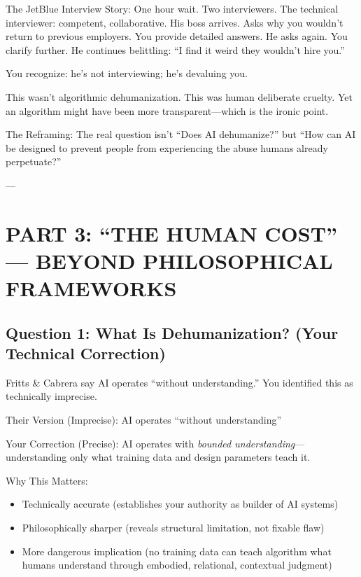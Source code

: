 \documentclass[12pt,letterpaper]{article}
\begin{document}
\begin{livedexperience}
The JetBlue Interview Story: One hour wait. Two interviewers. The technical interviewer: competent, collaborative. His boss arrives. Asks why you wouldn't return to previous employers. You provide detailed answers. He asks again. You clarify further. He continues belittling: ``I find it weird they wouldn't hire you.''

You recognize: he's not interviewing; he's devaluing you.

This wasn't algorithmic dehumanization. This was human deliberate cruelty. Yet an algorithm might have been more transparent---which is the ironic point.

The Reframing: The real question isn't ``Does AI dehumanize?'' but ``How can AI be designed to prevent people from experiencing the abuse humans already perpetuate?''
\end{livedexperience}

---

\section{PART 3: ``THE HUMAN COST'' --- BEYOND PHILOSOPHICAL FRAMEWORKS}

\subsection{Question 1: What Is Dehumanization? (Your Technical Correction)}

Fritts \& Cabrera say AI operates ``without understanding.'' You identified this as technically imprecise.

\begin{keyfindings}
Their Version (Imprecise): AI operates ``without understanding''

Your Correction (Precise): AI operates with \textit{bounded understanding}---understanding only what training data and design parameters teach it.

Why This Matters:
\begin{itemize}
\item Technically accurate (establishes your authority as builder of AI systems)
\item Philosophically sharper (reveals structural limitation, not fixable flaw)
\item More dangerous implication (no training data can teach algorithm what humans understand through embodied, relational, contextual judgment)
\end{itemize}
\end{keyfindings}
\end{document}
